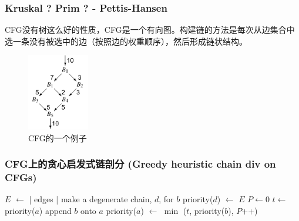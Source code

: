\begin{frame}[fragile]
    \frametitle{Kruskal ? Prim ? - Pettis-Hansen}

    CFG没有树这么好的性质，CFG是一个有向图。构建链的方法是每次从边集合中选一条没有被选中的边（按照边的权重顺序），然后形成链状结构。

    \begin{figure}
        \centering
        \includegraphics[width=0.24\textwidth]{images/example_cfg.png}
        \caption{CFG的一个例子\cite{cooper2011engineering}}
    \end{figure}



\end{frame}

\begin{frame}
    \frametitle{CFG上的贪心启发式链剖分 (Greedy heuristic chain div on CFGs)}

    \begin{algorithmic}
        \State $E$ $\gets$ | edges |
        \State make a degenerate chain, $d$, for $b$
        \State priority($d$) $\gets$ $E$
        \EndFor
        \State $P \gets 0$
        \State $ t \gets $ priority($a$)
        \State append $b$ onto $a$
        \State priority($a$) $\gets$ $\min$ ($t$, priority($b$), $P$++)
        \EndFor
    \end{algorithmic}


\end{frame}

